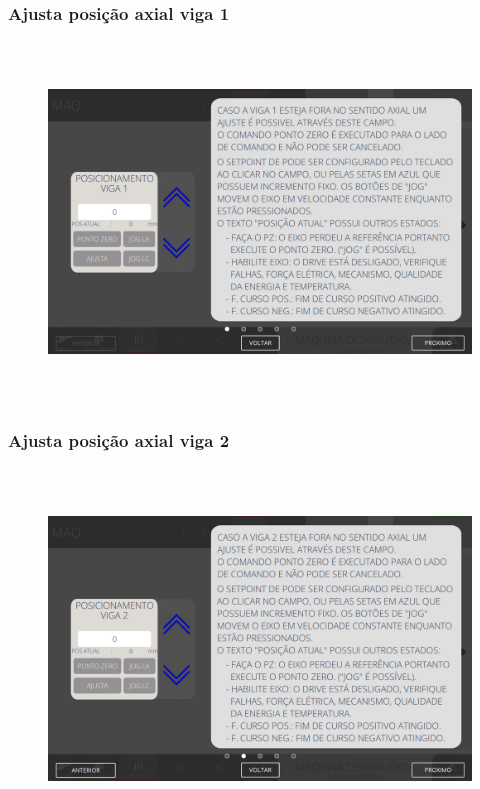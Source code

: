 \subsubsection{\small{Ajusta posição axial viga 1}}\label{telaAjustesDobraAjustaPosicaoAxialViga1}
\vspace*{\fill}
\begin{figure}[h]
  \centering
  \includegraphics[width=576px,height=360px]{src/imagesFlexo/07-fold/settings/e-1.png}
\end{figure}
\vspace*{\fill}

\newpage
\thispagestyle{fancy}
\vspace*{40 pt}
\subsubsection{\small{Ajusta posição axial viga 2}}\label{telaAjustesDobraAjustaPosicaoAxialViga2}
\vspace*{\fill}
\begin{figure}[h]
  \centering
  \includegraphics[width=576px,height=360px]{src/imagesFlexo/07-fold/settings/e-2.png}
\end{figure}
\vspace*{\fill}

